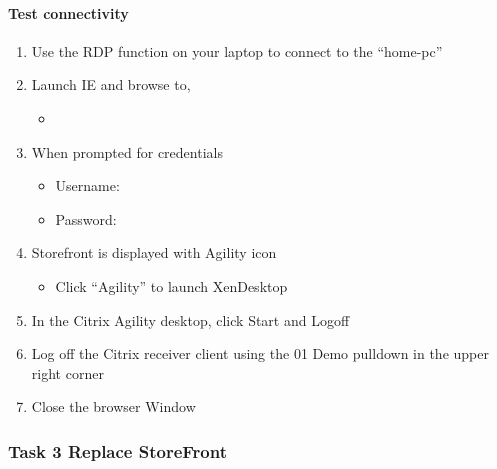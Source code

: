 \documentclass[letterpaper,10pt,english]{sphinxmanual}
\begin{document}
\paragraph{Test connectivity}
\label{\detokenize{class2/module2/lab1:test-connectivity}}\begin{enumerate}
\item {} 
Use the RDP function on your laptop to connect to the “home-pc”

\item {} 
Launch IE and browse to,
\begin{itemize}
\item {} 

\end{itemize}

\item {} 
When prompted for credentials
\begin{itemize}
\item {} 
Username: 

\item {} 
Password: 

\end{itemize}

\item {} 
Storefront is displayed with Agility icon
\begin{itemize}
\item {} 
Click “Agility” to launch XenDesktop

\end{itemize}

\item {} 
In the Citrix Agility desktop, click Start and Logoff

\item {} 
Log off the Citrix receiver client using the 01 Demo pulldown in the
upper right corner

\item {} 
Close the browser Window

\end{enumerate}


\subsubsection{Task 3 \textendash{} Replace StoreFront}
\label{\detokenize{class2/module2/lab1:task-3-replace-storefront}}
\end{document}
